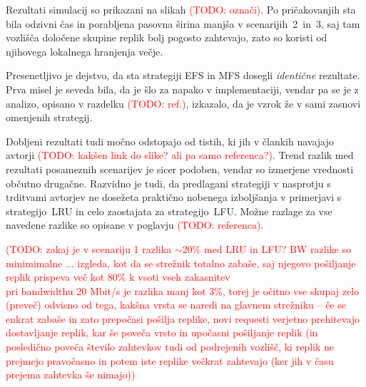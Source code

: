 \documentclass[a4paper, 12pt]{book}
\newcommand{\TODO}[1]{\textcolor{red}{(TODO: #1)}}
\begin{document}
Rezultati simulacij so prikazani na slikah \TODO{označi}. Po pričakovanjih
sta bila odzivni čas in porabljena pasovna širina manjša v scenarijih~2~in~3,
saj tam vozlišča določene skupine replik bolj pogosto zahtevajo, zato so
koristi od njihovega lokalnega hranjenja večje.

Presenetljivo je dejstvo, da sta strategiji EFS in MFS dosegli
\textit{identične} rezultate. Prva misel je seveda bila, da je šlo za napako v
implementaciji, vendar pa se je z analizo, opisano v razdelku \TODO{ref.},
izkazalo, da je vzrok že v sami zasnovi omenjenih strategij.

Dobljeni rezultati tudi močno odstopajo od tistih, ki jih v člankih
navajajo avtorji \TODO{kakšen link do slike? ali pa samo referenca?}.
Trend razlik med rezultati posameznih scenarijev je sicer podoben, vendar so
izmerjene vrednosti občutno drugačne. Razvidno je tudi, da predlagani
strategiji v nasprotju s trditvami avtorjev ne dosežeta praktično nobenega
izboljšanja v primerjavi s strategijo~LRU in celo zaostajata za
strategijo~LFU. Možne razlage za vse navedene razlike so opisane v
poglavju \TODO{referenca}.

\TODO{zakaj je v scenariju 1 razlika $\sim$20\% med LRU in LFU? BW razlike
so minimimalne ... izgleda, kot da se strežnik totalno zabaše, saj njegovo
pošiljanje replik prispeva več kot 80\% k vsoti vseh zakasnitev\\
pri bandwidthu 20 Mbit/s je razlika manj kot 3\%, torej je očitno vse skupaj
zelo (preveč) odvisno od tega, kakšna vrsta se naredi na glavnem strežniku
-- če se enkrat zabaše in zato prepočasi pošilja replike, novi requesti
verjetno prehitevajo dostavljanje replik, kar še poveča vrsto in upočasni
pošiljanje replik (in posledično poveča število zahtevkov tudi od podrejenih
vozlišč, ki replik ne prejmejo pravočasno in potem iste replike večkrat
zahtevajo (ker jih v času prejema zahtevka še nimajo)}
\end{document}
